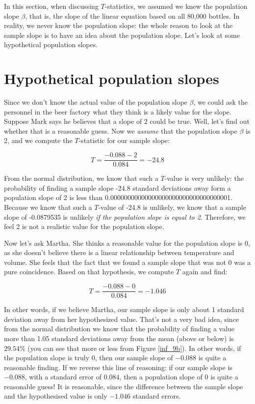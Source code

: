 \documentclass[]{report}\usepackage[]{graphicx}\usepackage[]{color}
\begin{document}
In this section, when discussing $T$-statistics, we assumed we knew the population slope $\beta$, that is, the slope of the linear equation based on all 80,000 bottles. In reality, we never know the population slope: the whole reason to look at the sample slope is to have an idea about the population slope. Let's look at some hypothetical population slopes.





\section{Hypothetical population slopes}


Since we don't know the actual value of the population slope $\beta$, we could ask the personnel in the beer factory what they think is a likely value for the slope. Suppose Mark says he believes that a slope of 2 could be true. Well, let's find out whether that is a reasonable guess. Now we \textit{assume} that the population slope $\beta$ is 2, and we compute the $T$-statistic for our sample slope:



\begin{equation}
T = \frac{-0.088-2}{0.084}= -24.8
\end{equation}

From the normal distribution, we know that such a $T$-value is very unlikely: the probability of finding a sample slope -24.8 standard deviations away form a population slope of 2 is less than 0.00000000000000000000000000000000001. Because we know that such a $T$-value of -24.8 is unlikely, we know that a sample slope of -0.0879535 is unlikely \textit{if the population slope is equal to 2}. Therefore, we feel 2 is not a realistic value for the population slope.


Now let's ask Martha. She thinks a reasonable value for the population slope is 0, as she doesn't believe there is a linear relationship between temperature and volume. She feels that the fact that we found a sample slope that was not 0 was a pure coincidence. Based on that hypothesis, we compute $T$ again and find:


\begin{equation}
T = \frac{-0.088-0}{0.084}= -1.046
\end{equation}

In other words, if we believe Martha, our sample slope is only about 1 standard deviation away from her hypothesized value. That's not a very bad idea, since from the normal distribution we know that the probability of finding a value more than 1.05 standard deviations away from the mean (above or below) is $29.54$\% (you can see that more or less from Figure \ref{inf_9b}). In other words, if the population slope is truly 0, then our sample slope of $-0.088$ is quite a reasonable finding. If we reverse this line of reasoning: if our sample slope is $-0.088$, with a standard error of $0.084$, then a population slope of 0 is quite a reasonable guess! It is reasonable, since the difference between the sample slope and the hypothesised value is only $-1.046$ standard errors.
\end{document}
